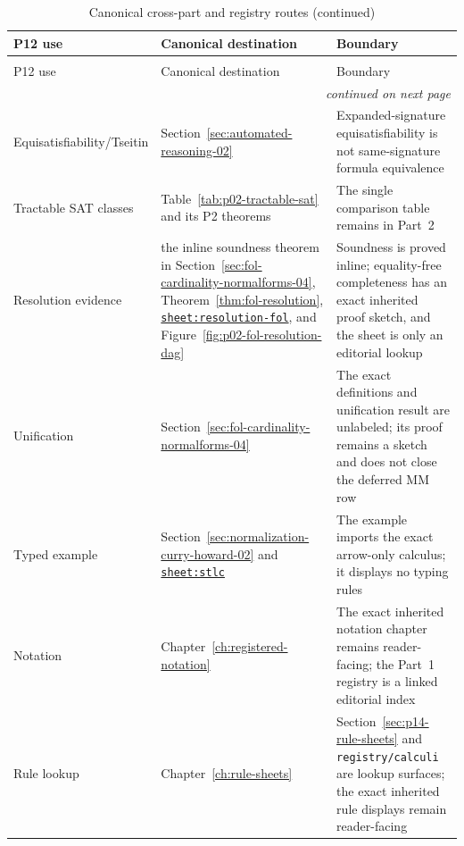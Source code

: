 \begin{longtable}{@{}p{}p{}p{}@{}}
\caption{Canonical cross-part and registry routes.}
\label{tab:p12-canonical-routes}\\
\toprule
P12 use & Canonical destination & Boundary \\ \midrule
\endfirsthead
\caption[]{Canonical cross-part and registry routes (continued)}\\
\toprule
P12 use & Canonical destination & Boundary \\ \midrule
\endhead
\midrule\multicolumn{3}{r}{\emph{continued on next page}}\\
\endfoot
\endlastfoot
Equisatisfiability/\allowbreak Tseitin &
Section~\ref{sec:automated-reasoning-02} & Expanded-signature equisatisfiability is not
same-signature formula equivalence \\ \addlinespace
Tractable SAT classes & Table~\ref{tab:p02-tractable-sat} and its P2
theorems & The single comparison table remains in Part~2 \\ \addlinespace
Resolution evidence &
the inline soundness theorem in Section~\ref{sec:fol-cardinality-normalforms-04},
Theorem~\ref{thm:fol-resolution},
\hyperref[sheet:resolution-fol]{\texttt{sheet:resolution-fol}}, and
Figure~\ref{fig:p02-fol-resolution-dag} & Soundness is proved inline;
equality-free completeness has an exact inherited proof sketch, and the sheet
is only an editorial lookup \\ \addlinespace
Unification & Section~\ref{sec:fol-cardinality-normalforms-04} & The exact
definitions and unification result are unlabeled; its proof remains a sketch
and does not close the deferred MM row \\ \addlinespace
Typed example & Section~\ref{sec:normalization-curry-howard-02} and
\hyperref[sheet:stlc]{\texttt{sheet:stlc}} & The example imports the exact
arrow-only calculus; it displays no typing rules \\ \addlinespace
Notation & Chapter~\ref{ch:registered-notation} & The exact inherited notation
chapter remains reader-facing; the Part~1 registry is a linked editorial index \\
\addlinespace
Rule lookup & Chapter~\ref{ch:rule-sheets} & Section~\ref{sec:p14-rule-sheets}
and \texttt{registry/calculi} are lookup surfaces; the exact inherited rule
displays remain reader-facing \\
\bottomrule
\end{longtable}
